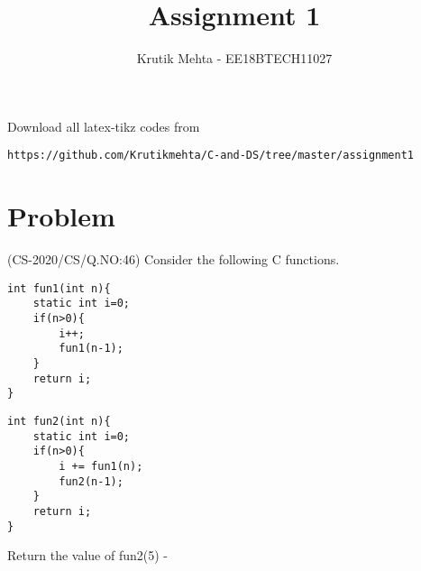 \documentclass[journal,12pt,twocolumn]{IEEEtran}
\begin{document}
     \def\rightbox#1{\makebox[0in][r]{#1}}
     \def\centbox#1{\makebox[0in]{#1}}
     \def\topbox#1{\raisebox{-\baselineskip}[0in][0in]{#1}}
     \def\midbox#1{\raisebox{-0.5\baselineskip}[0in][0in]{#1}}
\vspace{3cm}
\title{Assignment 1}
\author{Krutik Mehta - EE18BTECH11027}
\maketitle
\newpage
\bigskip
\renewcommand{\thefigure}{\theenumi}
\renewcommand{\thetable}{\theenumi}
Download all latex-tikz codes from 
%
\begin{lstlisting}
https://github.com/Krutikmehta/C-and-DS/tree/master/assignment1
\end{lstlisting}
\section{Problem}
(CS-2020/CS/Q.NO:46) Consider the following C functions.
\begin{lstlisting}
int fun1(int n){
    static int i=0;
    if(n>0){
        i++;
        fun1(n-1);
    }
    return i;
}
\end{lstlisting}

\begin{lstlisting}
int fun2(int n){
    static int i=0;
    if(n>0){
        i += fun1(n);
        fun2(n-1);
    }
    return i;
}
\end{lstlisting}

Return the value of fun2(5) - 
\end{document}

